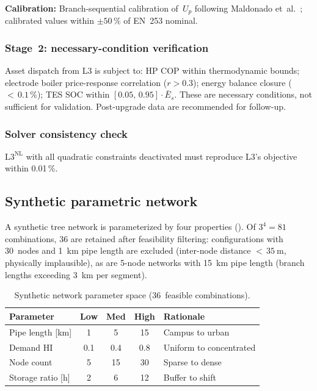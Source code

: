 \documentclass[review,3p]{elsarticle}
\newcommand{\Lnl}{\mathrm{L3}^{\mathrm{NL}}}
\begin{document}
\textbf{Calibration:} Branch-sequential calibration of~$U_p$
following Maldonado et~al.~\cite{Maldonado2024}; calibrated values
within $\pm 50\,\%$ of EN~253 nominal.

\subsubsection{Stage~2: necessary-condition verification}
\label{sec:val_stage2}

Asset dispatch from L3 is subject to: HP COP within thermodynamic
bounds; electrode boiler price-response correlation ($r > 0.3$);
energy balance closure (${<}\,0.1\,\%$); TES SOC within
$[0.05,\, 0.95] \cdot \bar{E}_s$. These are necessary conditions,
not sufficient for validation. Post-upgrade data are recommended for
follow-up.

\subsubsection{Solver consistency check}

$\Lnl$ with all quadratic constraints deactivated must reproduce L3's
objective within 0.01\,\%.

\subsection{Synthetic parametric network}
\label{sec:case_synthetic}

A synthetic tree network is parameterized by four properties
(). Of $3^4 = 81$ combinations, 36 are retained
after feasibility filtering: configurations with 30~nodes and
\SI{1}{\kilo\metre} pipe length are excluded (inter-node distance
${<}\,\SI{35}{\metre}$, physically implausible), as are 5-node
networks with \SI{15}{\kilo\metre} pipe length (branch lengths
exceeding \SI{3}{\kilo\metre} per segment).

\begin{table}[htbp]
\centering
\caption{Synthetic network parameter space (36~feasible combinations).}
\label{tab:synthetic}
\begin{tabular}{@{} l c c c l @{}}
\toprule
Parameter & Low & Med & High & Rationale \\
\midrule
Pipe length [km]  & 1   & 5   & 15  & Campus to urban \\
Demand HI         & 0.1 & 0.4 & 0.8 & Uniform to concentrated \\
Node count        & 5   & 15  & 30  & Sparse to dense \\
Storage ratio [h] & 2   & 6   & 12  & Buffer to shift \\
\bottomrule
\end{tabular}
\end{table}
\end{document}
